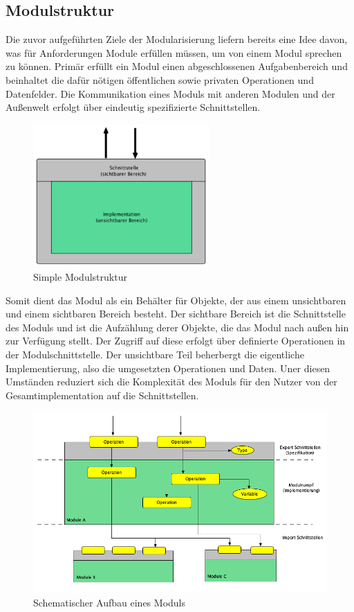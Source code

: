   \subsection{Modulstruktur}
    Die zuvor aufgeführten Ziele der Modularisierung liefern bereits eine Idee davon, was für Anforderungen Module erfüllen müssen, um von einem Modul sprechen zu können. Primär erfüllt ein Modul einen abgeschlossenen Aufgabenbereich und beinhaltet die dafür nötigen öffentlichen sowie privaten Operationen und Datenfelder.
    Die Kommunikation eines Moduls mit anderen Modulen und der Außenwelt erfolgt über eindeutig spezifizierte Schnittstellen.
      \begin{figure}[h!]
        \centering
        \includegraphics[width=0.6\textwidth]{material/images/simple-module.png}
        \caption{Simple Modulstruktur}
        \label{fig:simple-module}
      \end{figure} 
    Somit dient das Modul als ein Behälter für Objekte, der aus einem unsichtbaren und einem sichtbaren Bereich besteht. Der sichtbare Bereich ist die Schnittstelle des Moduls und ist die Aufzählung derer Objekte, die das Modul nach außen hin zur Verfügung stellt. Der Zugriff auf diese erfolgt über definierte Operationen in der Modulschnittstelle. 
    Der unsichtbare Teil beherbergt die eigentliche Implementierung, also die umgesetzten Operationen und Daten.
    Uner diesen Umständen reduziert sich die Komplexität des Moduls für den Nutzer von der Gesamtimplementation auf die Schnittstellen. 
      \begin{figure}[h!]
        \centering
        \includegraphics[width=\textwidth]{material/images/module-workflow.png}
        \caption{Schematischer Aufbau eines Moduls}
        \label{fig:module-workflow}
      \end{figure} 
